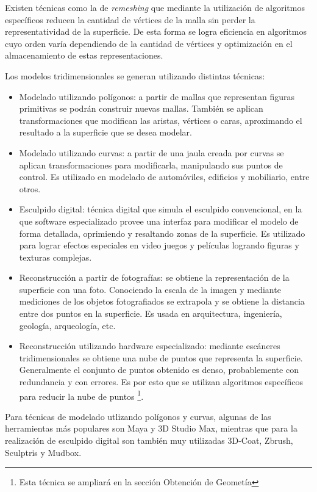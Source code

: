 Existen técnicas como la de \emph{remeshing} que mediante la utilización de algoritmos específicos reducen la cantidad de vértices de la malla sin perder la representatividad de la superficie. De esta forma se logra eficiencia en algoritmos cuyo orden varía dependiendo de la cantidad de vértices y optimización en el almacenamiento de estas representaciones. 

Los modelos tridimensionales se generan utilizando distintas técnicas:
\begin{itemize}
  \item Modelado utilizando polígonos: a partir de mallas que representan figuras primitivas se podrán construir nuevas mallas.
  También se aplican transformaciones que modifican las aristas, vértices o caras, aproximando el resultado a la superficie que se desea modelar.
  \item  Modelado utilizando curvas: a partir de una jaula creada por curvas se aplican transformaciones para modificarla, manipulando sus puntos de control. Es utilizado en modelado de automóviles, edificios y mobiliario, entre otros.

  \item Esculpido digital: técnica digital que simula el esculpido convencional, en la que software especializado provee una interfaz para modificar el modelo de forma detallada, oprimiendo y resaltando zonas de la superficie. Es utilizado para lograr efectos especiales en video juegos y películas logrando figuras y texturas complejas.

  \item Reconstrucción a partir de fotografías: se obtiene la representación de la superficie con una foto. Conociendo la escala de la imagen y mediante mediciones de los objetos fotografiados se extrapola y se obtiene la distancia entre dos puntos en la superficie. Es usada en arquitectura, ingeniería, geología, arqueología, etc.
  \item Reconstrucción utilizando hardware especializado: mediante escáneres tridimensionales se obtiene una nube de puntos que representa la superficie. Generalmente el conjunto de puntos obtenido es denso, probablemente con redundancia y con errores. Es por esto que se utilizan algoritmos específicos para reducir la nube de puntos \footnote{Esta técnica se ampliará en la sección Obtención de Geometía}.
  \end{itemize}
Para técnicas de modelado utlizando polígonos y curvas, algunas de las herramientas más populares son Maya\cite{Maya} y 3D Studio Max\cite{3DStudioMax}, mientras que para la realización de esculpido digital son también muy utilizadas 3D-Coat\cite{3DCoat}, Zbrush\cite{Zbrush}, Sculptris\cite{Sculptris} y Mudbox\cite{Mudbox}. 

